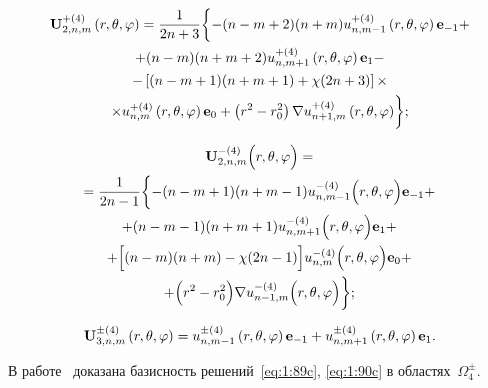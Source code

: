 \begin{multline}\label{eq:1:92}
{\bf{U}}_{2,n,m}^{ + (4)}\left( {r,\theta ,\varphi } \right) = \frac{1}{{2n + 3}}\bigg\{ { - (n - m + 2)(n + m)u_{n,m - 1}^{ + (4)}\left( {r,\theta ,\varphi } \right){{\bf{e}}_{ - 1}} + } \\
+ (n - m)(n + m + 2)u_{n,m + 1}^{ + (4)}\left( {r,\theta ,\varphi } \right){{\bf{e}}_1} - \\
- \left[ {(n - m + 1)(n + m + 1) + \chi (2n + 3)} \right] \times \\
{ \times u_{n,m}^{ + (4)}\left( {r,\theta ,\varphi } \right){{\bf{e}}_0} + \left( {{r^2} - r_0^2} \right)\nabla u_{n + 1,m}^{ + (4)}\left( {r,\theta ,\varphi } \right)} \bigg\};
\end{multline}

\begin{multline}\label{eq:1:93}
{\bf{U}}_{2,n,m}^{ - (4)}\Big( {r,\theta ,\varphi } \Big) = \\
= \frac{1}{{2n - 1}}\bigg\{ { - (n - m + 1)(n + m - 1)u_{n,m - 1}^{ - (4)}\Big( {r,\theta ,\varphi } \Big){{\bf{e}}_{ - 1}} + } \\
+ (n - m - 1)(n + m + 1)u_{n,m + 1}^{ - (4)}\Big( {r,\theta ,\varphi } \Big){{\bf{e}}_1} + \\
+ \Big[ {(n - m)(n + m) - \chi (2n - 1)} \Big] u_{n,m}^{ - (4)}\Big( {r,\theta ,\varphi } \Big){{\bf{e}}_0} + \\
+ \Big( {{r^2} - r_0^2} \Big)\nabla u_{n - 1,m}^{ - (4)}\Big( {r,\theta ,\varphi } \Big) \bigg\};
\end{multline}

\begin{equation}\label{eq:1:94}
{\bf{U}}_{3,n,m}^{ \pm (4)}\left( {r,\theta ,\varphi } \right) =  u_{n,m - 1}^{ \pm (4)}\left( {r,\theta ,\varphi } \right){{\bf{e}}_{ - 1}} + u_{n,m + 1}^{ \pm (4)}\left( {r,\theta ,\varphi } \right){{\bf{e}}_1}.
\end{equation}

В работе~\cite{Nikolaev1998} доказана базисность решений~\eqref{eq:1:89c}, \eqref{eq:1:90c} в областях~$\Omega_4^\pm$.

